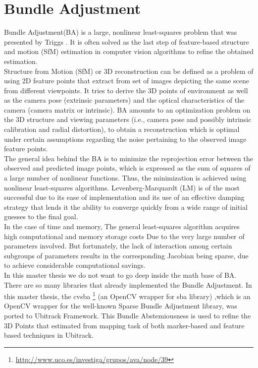 \chapter{Bundle Adjustment}\label{chapter:Bundle Adjustment}
Bundle Adjustment(BA) is a large, nonlinear least-squares problem that was presented by Triggs \cite{triggs2000bundle}. It is often solved as the last step of feature-based structure and motion (SfM) estimation in computer vision algorithms to refine the obtained estimation.\\
Structure from Motion (SfM) or 3D reconstruction can be defined as a problem of using 2D feature points that extract from  set of images depicting the same scene from different viewpoints. It tries to derive the 3D points of environment as well as the camera pose (extrinsic parameters) and the optical characteristics of the camera (camera matrix or intrinsic).
BA amounts to an optimization problem on the 3D structure and viewing parameters (i.e., camera pose and possibly intrinsic
calibration and radial distortion), to obtain a reconstruction which is optimal under certain assumptions regarding the noise pertaining to the observed image feature points. \\
The general idea behind the BA is to minimize the reprojection error between the observed and predicted image points, which is expressed as the sum of squares of a large number of nonlinear functions. Thus, the minimization is achieved using nonlinear least-squares algorithms. Levenberg-Marquardt (LM) is of the most successful due to its ease of implementation and its use of an effective damping strategy that lends it the ability to converge quickly from a wide range of initial guesses to the final goal.\\
In the case of time and memory, The general least-squares algorithm acquires high computational and memory storage costs Due to the very large number of parameters involved. But fortunately, the lack of interaction among certain subgroups of parameters results in the corresponding Jacobian being sparse, due to achieve considerable computational savings.\\
In this master thesis we do not want to go deep inside the math base of BA. There are so many libraries that already implemented the Bundle Adjustment. In this master thesis, the cvsba \footnote{\url{http://www.uco.es/investiga/grupos/ava/node/39}} (an OpenCV wrapper for sba library) ,which is an OpenCV wrapper for the well-known Sparse Bundle Adjustment library, was ported to Ubitrack Framework. This Bundle Abstemiousness is used to refine the 3D Points that estimated from mapping task of both marker-based and feature based techniques in Ubitrack.\\

